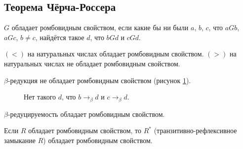\subsection{\texorpdfstring{Теорема Чёрча-Россера}{Church-Rosser theorem}}

\begin{definition}
    $G$ обладает ромбовидным свойством, если какие бы ни были $a$, $b$, $c$, что $aGb$, $aGc$, $b \ne c$, найдётся такое $d$, что $bGd$ и $cGd$.
\end{definition}

\begin{example}
    $(<)$ на натуральных числах обладает ромбовидным свойством.
    $(>)$ на натуральных числах не обладает ромбовидным свойством.

$\beta$-редукция не обладает ромбовидным свойством (рисунок \ref{no-diamond}).
\begin{figure}[ht]
    \centering
    \caption{Нет такого $d$, что $b \to_{\beta} d$ и $c \to_{\beta} d$.}
    \label{no-diamond}
\end{figure}
\end{example}

\begin{theorem} \label{church-rosser}
    $\beta$-редуцируемость обладает ромбовидным свойством.
\end{theorem}

\begin{lemma}
    Если $R$ обладает ромбовидным свойством, то $R^{*}$ (транзитивно-рефлексивное замыкание $R$) обладает ромбовидным свойством.
\end{lemma}


